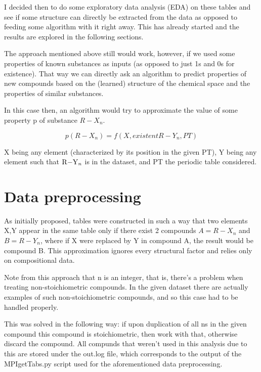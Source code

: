 \documentclass[]{article}
\begin{document}
I decided then to do some exploratory data analysis (EDA) on these tables and see if some structure can directly be extracted from the data as opposed to feeding some algorithm with it right away. This has already started and the results are explored in the following sections.

The approach mentioned above still would work, however, if we used some properties of known substances as inputs (as opposed to just 1s and 0s for existence). That way we can directly ask an algorithm to predict properties of new compounds based on the (learned) structure of the chemical space and the properties of similar substances. 

In this case then, an algorithm would try to approximate the value of some property p of substance $R-X_n$.

\begin{equation}
\label{eq:eq1}
 p(R-X_n) = f( X, existent R-Y_n , PT )
\end{equation}

X being any element (characterized by its position in the given PT), Y being any element such that $\ce{R-Y_n}$ is in the dataset, and PT the periodic table considered.


\section{Data preprocessing}
\label{sec:sec2}

As initially proposed, tables were constructed in such a way that two elements X,Y appear in the same table only if there exist 2 compounds $A = R-X_n$ and $B = R-Y_n$, where if X were replaced by Y in compound A, the result would be compound B. This approximation ignores every structural factor and relies only on compositional data.

Note from this approach that n is an integer, that is, there's a problem when treating non-stoichiometric compounds. In the given dataset there are actually examples of such non-stoichiometric compounds, and so this case had to be handled properly.

This was solved in the following way: if upon duplication of all ns in the given compound this compound is stoichiometric, then work with that, otherwise discard the compound. All compunds that weren't used in this analysis due to this are stored under the out.log file, which corresponds to the output of the MPIgetTabs.py script used for the aforementioned data preprocessing. 
\end{document}
